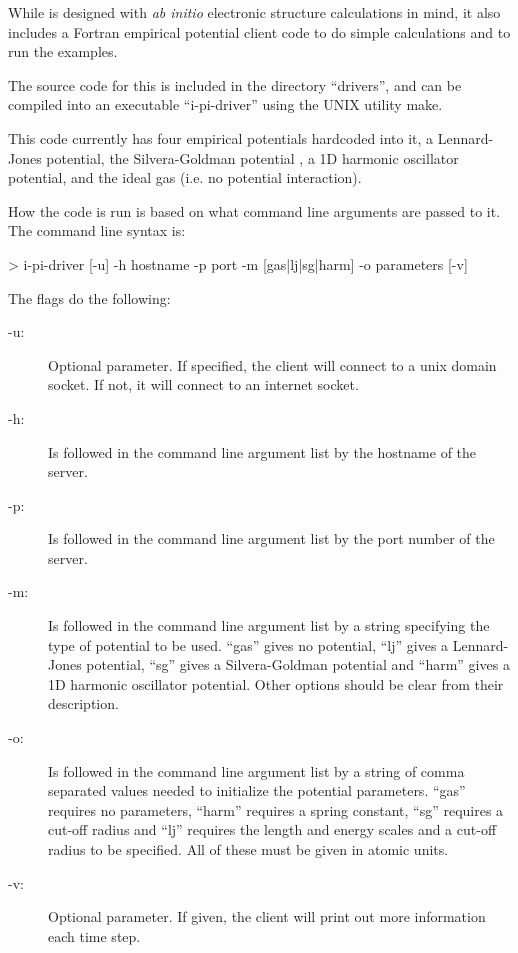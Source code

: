 \documentclass[11pt,english,fleqn]{report}
\newenvironment{code}{%
\footnotesize
\verbatim
}{
\endverbatim
\normalsize
}
\begin{document}
While \ipi is designed with \emph{ab initio} electronic structure calculations
in mind, it also includes a Fortran empirical potential client code to do
simple calculations and to run the examples.

The source code for this is included in the directory {}``drivers'', and can
be compiled into an executable {}``i-pi-driver'' using the UNIX utility make.

This code currently has four empirical potentials hardcoded into it,
a Lennard-Jones potential, the Silvera-Goldman potential \cite{silv-gold78jcp},
a 1D harmonic oscillator potential, and the ideal gas (i.e. no potential
interaction).

How the code is run is based on what command line arguments are passed to it.
The command line syntax is:

\begin{code}
> i-pi-driver [-u] -h hostname -p port -m [gas|lj|sg|harm] -o parameters [-v]
\end{code}

The flags do the following:

\begin{description}
\item[-u:] Optional parameter. If specified, the client will connect to
a unix domain socket. If not, it will connect to an internet socket.
\item[-h:] Is followed in the command line argument list by the hostname
of the server.
\item[-p:] Is followed in the command line argument list by the port number
of the server.
\item[-m:] Is followed in the command line argument list by a string
specifying the type of potential to be used. {}``gas'' gives no potential,
{}``lj'' gives a Lennard-Jones potential, {}``sg'' gives a Silvera-Goldman
potential and {}``harm'' gives a 1D harmonic oscillator potential. Other options
should be clear from their description.
\item[-o:] Is followed in the command line argument list by a string of
comma separated values needed to initialize the potential parameters.
{}``gas'' requires no parameters, {}``harm'' requires a spring constant,
{}``sg'' requires a cut-off radius and {}``lj'' requires the length and
energy scales and a cut-off radius to be specified. All of these must
be given in atomic units.
\item[-v:] Optional parameter. If given, the client will print out
more information each time step.
\end{description}
\end{document}
